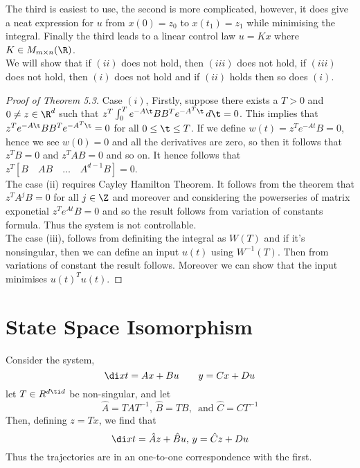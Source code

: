 The third is easiest to use, the second is more complicated, however, it does give a neat expression for $u$ from $x(0) = z_0$ to $x(t_1) = z_1$ while minimising the integral. Finally the third leads to a linear control law $u = Kx$ where $K \in M_{m \times n}(\R)$.\\

\noindent
We will show that if $(ii)$ does not hold, then $(iii)$ does not hold, if $(iii)$ does not hold, then $(i)$ does not hold and if $(ii)$ holds then so does $(i)$.\\

\begin{proof}[Proof of Theorem 5.3]
  Case $(i)$, Firstly, suppose there exists a $T > 0$ and $0 \ne z \in \R^d$ such that $z^T\int_0^T e^{-A\t}BB^T e^{-A^T\t}\,d\t = 0$. This implies that $z^T e^{-A\t}BB^T e^{-A^T\t} = 0$ for all $0 \le \t \le T$. If we define $w(t) = z^T e^{-At}B = 0$, hence we see $w(0) = 0$ and all the derivatives are zero, so then it follows that $z^TB = 0$ and $z^TAB = 0$ and so on.
  It hence follows that $z^T [B \quad AB \quad \dots \quad A^{d-1}B] = 0$.\\

  \noindent
  The case (ii) requires Cayley Hamilton Theorem. It follows from the theorem that $z^T A^jB = 0$ for all $j \in \Z$ and moreover and considering the powerseries of matrix exponetial $z^Te^{At}B = 0$ and so the result follows from variation of constants formula. Thus the system is not controllable.\\

  \noindent
  The case (iii), follows from definiting the integral as $W(T)$ and if it's nonsingular, then we can define an input $u(t)$ using $W^{-1}(T)$. Then from variations of constant the result follows. Moreover we can show that the input minimises $u(t)^Tu(t)$.
\end{proof}

\section{State Space Isomorphism}
Consider the system,
$$ \di x t = Ax + Bu \qquad y = Cx + Du $$
let $T \in R^{d \ti d}$ be non-singular, and let
$$ \hat A = TAT^{-1},\, \hat B = TB,\, \text{ and } \hat C = CT^{-1} $$
Then, defining $z = Tx$, we find that
$$ \di x t = \hat Az + \hat Bu,\, y = \hat Cz + Du $$
Thus the trajectories are in an one-to-one correspondence with the first. \\

